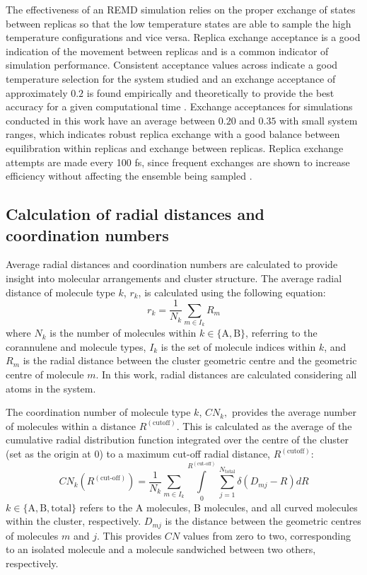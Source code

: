 The effectiveness of an REMD simulation relies on the proper exchange of states between replicas so that the low temperature states are able to sample the high temperature configurations and vice versa. Replica exchange acceptance is a good indication of the movement between replicas and is a common indicator of simulation performance. Consistent acceptance values across indicate a good temperature selection for the system studied and an exchange acceptance of approximately $0.2$ is found empirically and theoretically to provide the best accuracy for a given computational time \cite{Rathore2005,Kone}. Exchange acceptances for simulations conducted in this work have an average between $0.20$ and $0.35$ with small system ranges, which indicates robust replica exchange with a good balance between equilibration within replicas and exchange between replicas. Replica exchange attempts are made every 100 fs, since frequent exchanges are shown to increase efficiency without affecting the ensemble being sampled \cite{sindhikara2008exchange,sindhikara2010exchange}.

\subsection{Calculation of radial distances and coordination numbers}
\label{secSI:raddist_CN_eqns}
%
Average radial distances and coordination numbers are calculated to provide insight into molecular arrangements and cluster structure. The average radial distance of molecule type $k$, $r_{k}$, is calculated using the following equation:
\begin{equation}
    r_{k} = \frac{1}{N_{k}}\sum_{m \in I_{k}}R_{m}
\end{equation}
where $N_{k}$ is the number of molecules within $k \in \{\text{A},\text{B}\}$, referring to the corannulene and  molecule types, $I_{k}$ is the set of molecule indices within $k$, and $R_{m}$ is the radial distance between the cluster geometric centre and the geometric centre of molecule $m$. In this work, radial distances are calculated considering all atoms in the system.

The coordination number of molecule type $k$, $CN_{k},$ provides the average number of molecules within a distance $R^{(\text{cutoff})}$. This is calculated as the average of the cumulative radial distribution function integrated over the centre of the cluster (set as the origin at 0) to a maximum cut-off radial distance, $R^{(\text{cutoff})}$:
\begin{equation}
    CN_{k}(R^{(\text{cut-off})}) = \frac{1}{N_{k}} \sum_{m \in I_{k}} \int\limits_{0}^{R^{(\text{cut-off})}}  \sum_{j=1}^{N_{\text{total}}} \delta(D_{mj} - R) dR
\end{equation}
$k \in \{\text{A}, \text{B}, \text{total}\}$ refers to the A molecules, B molecules, and all curved molecules within the cluster, respectively. $D_{mj}$ is the distance between the geometric centres of molecules $m$ and $j$. 
This provides $CN$ values from zero to two, corresponding to an isolated molecule and a molecule sandwiched between two others, respectively.

